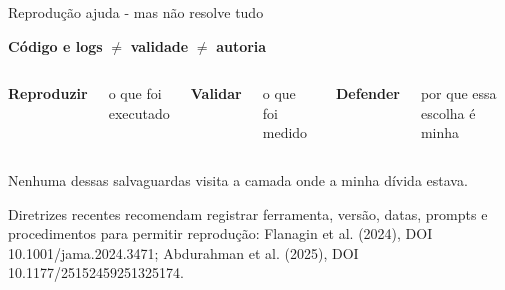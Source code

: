 \documentclass[
  12pt,
  ignorenonframetext,
  aspectratio=169]{beamer}
\begin{document}
\begin{frame}{Reprodução ajuda - mas não resolve tudo}
\protect{}\label{reproduuxe7uxe3o-ajuda---mas-nuxe3o-resolve-tudo}
\begin{center}
\vspace{0.35cm}
\Large
\textbf{Código e logs} \quad $\neq$ \quad \textbf{validade} \quad $\neq$ \quad \textbf{autoria}

\vspace{0.65cm}
\begin{columns}[T,onlytextwidth]
\centering\textbf{Reproduzir}

\vspace{0.18cm}
\normalsize o que foi executado

\centering\textbf{Validar}

\vspace{0.18cm}
\normalsize o que foi medido

\centering\textbf{Defender}

\vspace{0.18cm}
\normalsize por que essa escolha é minha
\end{columns}

\vspace{0.55cm}
\large Nenhuma dessas salvaguardas visita a camada onde a minha dívida estava.
\end{center}

\vfill{\tiny\color{muted}Diretrizes recentes recomendam registrar ferramenta, versão, datas, prompts e procedimentos para permitir reprodução: Flanagin et al. (2024), DOI 10.1001/jama.2024.3471; Abdurahman et al. (2025), DOI 10.1177/25152459251325174.}
\end{frame}
\end{document}

